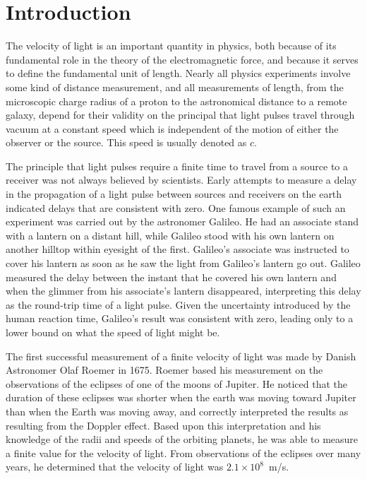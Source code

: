 \documentclass{revtex4}
\begin{document}
\section{Introduction}

The velocity of light is an important quantity in physics, both because of
its fundamental role in the theory of the electromagnetic force, and because
it serves to define the fundamental unit of length.  Nearly all physics
experiments involve some kind of distance measurement, and all measurements
of length, from the microscopic charge radius of a proton to the astronomical
distance to a remote galaxy, depend for their validity on the principal that
light pulses travel through vacuum at a constant speed which is independent
of the motion of either the observer or the source.  This speed is usually
denoted as $c$.  

The principle that light pulses require a finite time to travel from a source
to a receiver was not always believed by scientists.  Early attempts to 
measure a delay in the propagation of a light pulse between sources and
receivers on the earth indicated delays that are consistent with zero.  One
famous example of such an experiment was carried out by the astronomer Galileo.
He had an associate stand with a lantern on a distant hill, while Galileo
stood with his own lantern on another hilltop within eyesight of the first.
Galileo's associate was instructed to cover his lantern as soon as he saw
the light from Galileo's lantern go out.  Galileo measured the delay between
the instant that he covered his own lantern and when the glimmer from his
associate's lantern disappeared, interpreting this delay as the round-trip
time of a light pulse.  Given the uncertainty introduced by the human reaction
time, Galileo's result was consistent with zero, leading only to a lower 
bound on what the speed of light might be.

The first successful measurement of a finite velocity of light was made by
Danish Astronomer Olaf Roemer in 1675. Roemer based his measurement on the
observations of the eclipses of one of the moons of Jupiter. He noticed that
the duration of these eclipses was shorter when the earth was moving toward
Jupiter than when the Earth was moving away, and correctly interpreted the
results as resulting from the Doppler effect.  Based upon this interpretation
and his knowledge of the radii and speeds of the orbiting planets, he was able
to measure a finite value for the velocity of light. From observations of the
eclipses over many years, he determined that the velocity of light was
$2.1\times 10^8$~m/s.
\end{document}
